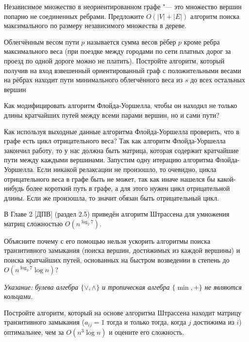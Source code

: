 \documentclass[12pt]{extreport}
\theoremstyle{definiton}
\theoremstyle{definition}
\theoremstyle{definition}
\newcounter{problem}
\newcounter{subproblem}
\newcounter{subrproblem}
\def\prsub{\medskip\noindent\stepcounter{subproblem}\setcounter{subrproblem}{0}{\sf \thesubproblem .}\;}
\def\prend{
	\bigskip
}
\begin{document}
	\Pr[4] Независимое множество в неориентированном графе "--- это множество вершин попарно не соединенных ребрами. Предложите $O(|V|+|E|)$ алгоритм поиска максимального по размеру независимого множества в дереве.

	\prend
	
\Pr[4] Облегчённым весом пути $p$ называется сумма весов рёбер $p$ кроме ребра максимального веса (при поездке между городами по сети платных дорог за проезд по одной дороге можно не платить). Постройте алгоритм, который получив на вход взвешенный ориентированный граф с положительными весами на рёбрах находит пути минимального облегчённого веса из $s$ до всех остальных вершин

\prend

\Pr[2] Как модифицировать алгоритм Флойда-Уоршелла, чтобы он находил не только длины кратчайших путей между всеми парами вершин, но и сами пути?

\prend

\Pr[2] Как используя выходные данные алгоритма Флойда-Уоршелла проверить, что в графе есть цикл отрицательного веса?
\newline
Так как алгоритм Флойда-Уоршелла закончил работу, то у нас должна быть матрица, которая содержит кратчайшие пути между каждыми вершинами. Запустим одну итерацию алгоритма Флойда-Уоршелла. Если никакой релаксации не произошло, то очевидно, цикла отрицательного веса в графе быть не может, так как иначе нашелся бы какой-нибудь более короткий путь в графе, а для этого нужен цикл отрицательной длины. Если же произошла, то значит обязан быть отрицательный цикл.

\prend

\Pr[1+3] В Главе 2 [ДПВ] (раздел 2.5) приведён алгоритм Штрассена для умножения матриц сложностью $O(n^{\log_2 7})$.

\prsub Объясните почему с его помощью нельзя ускорить алгоритмы поиска транзитивного замыкания (поиска вершин, достижимых из каждой вершины) и поиска кратчайших путей, основанных на быстром возведении в степень до $O(n^{\log_2 7}\log n)$?

\smallskip

\noindent\textsl{Указание: булева алгебра $\{ \lor, \land\}$ и тропическая алгебра $\{\min, +\}$ не являются кольцами.} 

\prend

\prsub Постройте алгоритм, который на основе алгоритма Штрассена находит матрицу транзитивного замыкания ($a_{ij} = 1$ тогда и только тогда, когда $j$ достижима из $i$) оптимальнее, чем за $O(n^{3}\log n)$ и оцените его сложность.
\end{document}
